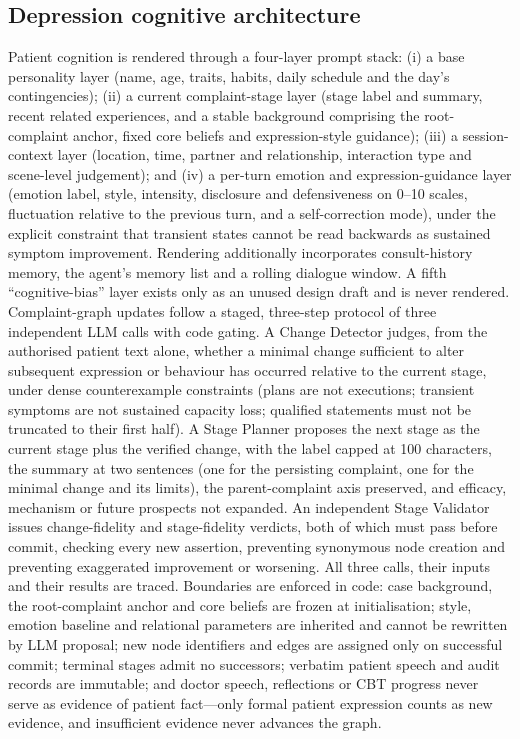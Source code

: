 \documentclass[sn-nature,pdflatex]{sn-jnl}
\begin{document}
\subsection*{Depression cognitive architecture}

Patient cognition is rendered through a four-layer prompt stack: (i) a base personality layer (name, age, traits, habits, daily schedule and the day's contingencies); (ii) a current complaint-stage layer (stage label and summary, recent related experiences, and a stable background comprising the root-complaint anchor, fixed core beliefs and expression-style guidance); (iii) a session-context layer (location, time, partner and relationship, interaction type and scene-level judgement); and (iv) a per-turn emotion and expression-guidance layer (emotion label, style, intensity, disclosure and defensiveness on 0--10 scales, fluctuation relative to the previous turn, and a self-correction mode), under the explicit constraint that transient states cannot be read backwards as sustained symptom improvement. Rendering additionally incorporates consult-history memory, the agent's memory list and a rolling dialogue window. A fifth ``cognitive-bias'' layer exists only as an unused design draft and is never rendered. Complaint-graph updates follow a staged, three-step protocol of three independent LLM calls with code gating. A Change Detector judges, from the authorised patient text alone, whether a minimal change sufficient to alter subsequent expression or behaviour has occurred relative to the current stage, under dense counterexample constraints (plans are not executions; transient symptoms are not sustained capacity loss; qualified statements must not be truncated to their first half). A Stage Planner proposes the next stage as the current stage plus the verified change, with the label capped at 100 characters, the summary at two sentences (one for the persisting complaint, one for the minimal change and its limits), the parent-complaint axis preserved, and efficacy, mechanism or future prospects not expanded. An independent Stage Validator issues change-fidelity and stage-fidelity verdicts, both of which must pass before commit, checking every new assertion, preventing synonymous node creation and preventing exaggerated improvement or worsening. All three calls, their inputs and their results are traced. Boundaries are enforced in code: case background, the root-complaint anchor and core beliefs are frozen at initialisation; style, emotion baseline and relational parameters are inherited and cannot be rewritten by LLM proposal; new node identifiers and edges are assigned only on successful commit; terminal stages admit no successors; verbatim patient speech and audit records are immutable; and doctor speech, reflections or CBT progress never serve as evidence of patient fact---only formal patient expression counts as new evidence, and insufficient evidence never advances the graph.
\end{document}
